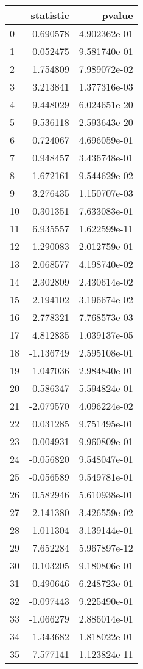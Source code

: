 \begin{tabular}{lrr}
\toprule
{} &  statistic &        pvalue \\
\midrule
0  &   0.690578 &  4.902362e-01 \\
1  &   0.052475 &  9.581740e-01 \\
2  &   1.754809 &  7.989072e-02 \\
3  &   3.213841 &  1.377316e-03 \\
4  &   9.448029 &  6.024651e-20 \\
5  &   9.536118 &  2.593643e-20 \\
6  &   0.724067 &  4.696059e-01 \\
7  &   0.948457 &  3.436748e-01 \\
8  &   1.672161 &  9.544629e-02 \\
9  &   3.276435 &  1.150707e-03 \\
10 &   0.301351 &  7.633083e-01 \\
11 &   6.935557 &  1.622599e-11 \\
12 &   1.290083 &  2.012759e-01 \\
13 &   2.068577 &  4.198740e-02 \\
14 &   2.302809 &  2.430614e-02 \\
15 &   2.194102 &  3.196674e-02 \\
16 &   2.778321 &  7.768573e-03 \\
17 &   4.812835 &  1.039137e-05 \\
18 &  -1.136749 &  2.595108e-01 \\
19 &  -1.047036 &  2.984840e-01 \\
20 &  -0.586347 &  5.594824e-01 \\
21 &  -2.079570 &  4.096224e-02 \\
22 &   0.031285 &  9.751495e-01 \\
23 &  -0.004931 &  9.960809e-01 \\
24 &  -0.056820 &  9.548047e-01 \\
25 &  -0.056589 &  9.549781e-01 \\
26 &   0.582946 &  5.610938e-01 \\
27 &   2.141380 &  3.426559e-02 \\
28 &   1.011304 &  3.139144e-01 \\
29 &   7.652284 &  5.967897e-12 \\
30 &  -0.103205 &  9.180806e-01 \\
31 &  -0.490646 &  6.248723e-01 \\
32 &  -0.097443 &  9.225490e-01 \\
33 &  -1.066279 &  2.886014e-01 \\
34 &  -1.343682 &  1.818022e-01 \\
35 &  -7.577141 &  1.123824e-11 \\
\bottomrule
\end{tabular}
